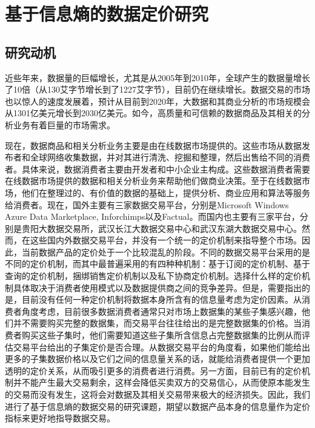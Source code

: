 \chapter{基于信息熵的数据定价研究}

\section{研究动机}
近些年来，数据量的巨幅增长，尤其是从2005年到2010年，全球产生的数据量增长了10倍（从130艾字节增长到了1227艾字节），目前仍在继续增长\cite{gantz2012digital,villars2011big}。数据交易的市场也以惊人的速度发展着，预计从目前到2020年，大数据和其商业分析的市场规模会从1301亿美元增长到2030亿美元\cite{idc}。如今，高质量和可信赖的数据商品及其相关的分析业务有着巨量的市场需求\cite{gantz2012digital,maitland2002european,turner2014digital,villars2011big}。

现在，数据商品和相关分析业务主要是由在线数据市场提供的。这些市场从数据发布者和全球网络收集数据，并对其进行清洗、挖掘和整理，然后出售给不同的消费者。具体来说，数据消费者主要由开发者和中小企业主构成。这些数据消费者需要在线数据市场提供的数据和相关分析业务来帮助他们做商业决策。至于在线数据市场，他们在整理过的、有价值的数据的基础上，提供分析、商业应用和算法等服务给消费者。现在，国外主要有三家数据交易平台，分别是Microsoft Windows Azure Data Marketplace\cite{MicrosoftAzure}, Inforchimps\cite{infochimps}以及Factual\cite{factual}。而国内也主要有三家平台，分别是贵阳大数据交易所\cite{gbdex}，武汉长江大数据交易中心和武汉东湖大数据交易中心\cite{chinadatatrading}。然而，在这些国内外数据交易平台，并没有一个统一的定价机制来指导整个市场。因此，当前数据产品的定价处于一个比较混乱的阶段。不同的数据交易平台采用的是不同的定价机制，而其中最普遍采用的有四种种机制：基于订阅的定价机制、基于查询的定价机制，捆绑销售定价机制以及私下协商定价机制。选择什么样的定价机制具体取决于消费者使用模式以及数据提供商之间的竞争差异。但是，需要指出的是，目前没有任何一种定价机制将数据本身所含有的信息量考虑为定价因素。从消费者角度考虑，目前很多数据消费者通常只对市场上数据集的某些子集感兴趣，他们并不需要购买完整的数据集，而交易平台往往给出的是完整数据集的价格。当消费者购买这些子集时，他们需要知道这些子集所含信息占完整数据集的比例从而评估交易平台给出的子集定价是否合理。从数据交易平台的角度看，如果他们能给出更多的子集数据价格以及它们之间的信息量关系的话，就能给消费者提供一个更加透明的定价关系，从而吸引更多的消费者进行消费。另一方面，目前已有的定价机制并不能产生最大交易剩余，这样会降低买卖双方的交易信心，从而使原本能发生的交易而没有发生，这将会对数据及其相关交易带来极大的经济损失。因此，我们进行了基于信息熵的数据交易的研究课题，期望以数据产品本身的信息量作为定价指标来更好地指导数据交易。

